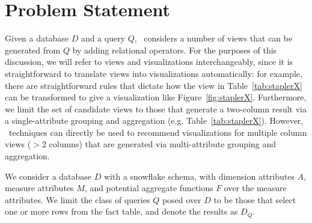 

\section{Problem Statement}
\label{sec:problem_statement}

Given a database $D$ and a query $Q$, \SeeDB\ considers a number of views that
can be generated from $Q$ by adding relational operators.
For the purposes of this discussion, we will refer to views and visualizations
interchangeably, since it is straightforward to translate views into
visualizations automatically: for example, there are straightforward rules that
dictate how the view in Table~\ref{tab:staplerX} can be transformed to give a
visualization like Figure~\ref{fig:staplerX}.
Furthermore, we limit the set of candidate views to those
that generate a two-column result via a single-attribute grouping and
aggregation (e.g. Table~\ref{tab:staplerX}). However, \SeeDB\ techniques can
directly be used to recommend visualizations for
multiple column views ($> 2$ columns) that are generated via multi-attribute
grouping and aggregation.


We consider a database $D$ with a snowflake schema,
with dimension attributes $A$, measure attributes $M$, and potential
aggregate functions $F$ over the measure attributes.
We limit the class of queries $Q$ posed over $D$ to be
those that select one or more rows from the fact table, and denote the results
as $D_Q$. 

